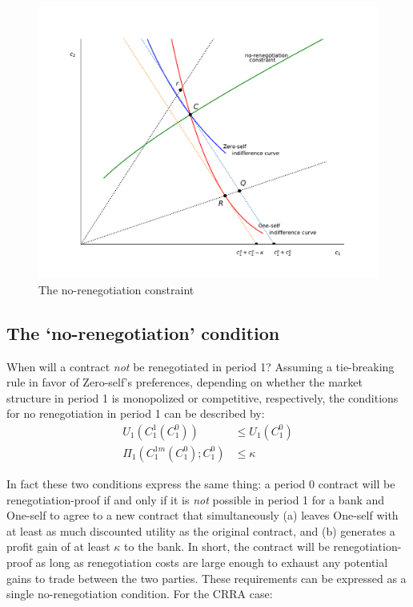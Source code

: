 \documentclass[11pt,english]{article}
\theoremstyle{plain}
\theoremstyle{definition}
\begin{document}
 
\begin{figure}[p]
\includegraphics[scale=0.7]{Figure2.pdf}\caption{The no-renegotiation constraint}
\label{fig:renegproof} 
\end{figure}


\subsection{The `no-renegotiation' condition}

\label{sec-no-reneg-cond}

When will a contract \textit{not} be renegotiated in period 1? Assuming
a tie-breaking rule in favor of Zero-self's preferences, depending
on whether the market structure in period 1 is monopolized or competitive,
respectively, the conditions for no renegotiation in period 1 can be described by:
\begin{align}
U_{1}\left(C_{1}^{1}\left(C_{1}^{0}\right)\right) & \leq U_{1}\left(C_{1}^{0}\right)\label{eq:no-reg-comp}\\
\Pi_{1}\left(C_{1}^{1m}\left(C_{1}^{0}\right);C_{1}^{0}\right) & \leq\kappa\label{eq:no-reg-monop}
\end{align}

In fact these two conditions express the same thing: a period 0 contract will be renegotiation-proof if and only if it is \textit{not} possible in period 1 for a bank and One-self to agree to a new contract that simultaneously (a) leaves One-self with at least as much discounted utility as the original contract, and (b) generates a profit gain of at least $\kappa$ to the bank. In short, the contract will be renegotiation-proof as long as renegotiation costs are large enough to exhaust any potential gains to trade between the two parties. These requirements can be expressed as a single no-renegotiation condition. For the CRRA case:
\end{document}
